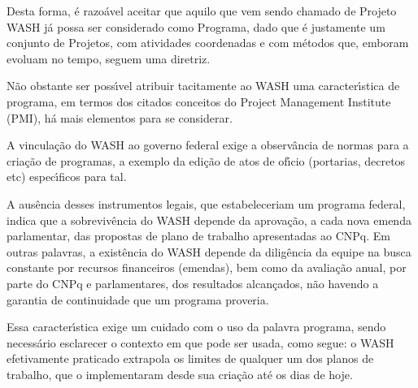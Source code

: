 \documentclass[
12pt,		%
openright,	%
twoside,  %
a4paper,			%
chapter=TITLE,		%
english,			%
french,				%
spanish,			%
brazil				%
]{USPSC-classe/USPSC}
\begin{document}
\noindent\begin{center}\mbox{\centering{}}\end{center}


Desta forma, \'e razo\'avel aceitar que aquilo que vem sendo chamado de Projeto WASH j\'a possa ser considerado como Programa, dado que \'e justamente um conjunto de Projetos, com atividades coordenadas e com m\'etodos que, emboram evoluam no tempo, seguem uma diretriz.








N\~ao obstante ser poss\'{\i}vel atribuir tacitamente ao WASH uma caracter\'{\i}stica de programa, em termos dos citados conceitos do Project Management Institute (PMI), h\'a mais elementos para se considerar.








A vincula\c{c}\~ao do WASH ao governo federal exige a observ\^ancia de normas para a cria\c{c}\~ao de programas, a exemplo da edi\c{c}\~ao de atos de of\'{\i}cio (portarias, decretos etc) espec\'{\i}ficos para tal.








A aus\^encia desses instrumentos legais, que estabeleceriam um \textquotedbl programa federal\textquotedbl , indica que a sobreviv\^encia do WASH depende da aprova\c{c}\~ao, a cada nova emenda parlamentar, das propostas de plano de trabalho apresentadas ao CNPq. Em outras palavras, a exist\^encia do WASH depende da dilig\^encia da equipe na busca constante por recursos financeiros (emendas), bem como da avalia\c{c}\~ao anual, por parte do CNPq e parlamentares, dos resultados alcan\c{c}ados, n\~ao havendo a garantia de continuidade que um programa proveria.








Essa caracter\'{\i}stica exige um cuidado com o uso da palavra \textquotedbl programa\textquotedbl , sendo necess\'ario esclarecer o contexto em que pode ser usada, como segue: o WASH efetivamente praticado extrapola os limites de qualquer um dos planos de trabalho, que o implementaram desde sua cria\c{c}\~ao at\'e os dias de hoje.
\end{document}
